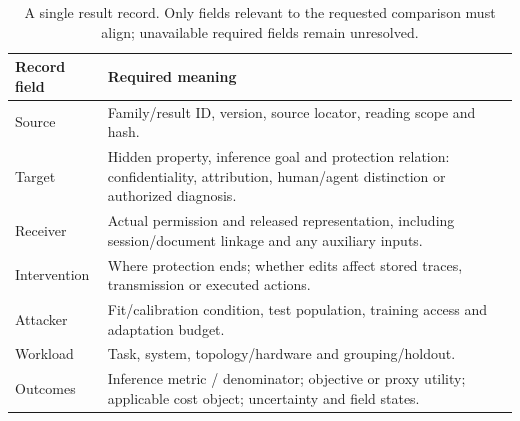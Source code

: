 \begin{table}[t]\centering\footnotesize
\caption{A single result record. Only fields relevant to the requested comparison must align; unavailable required fields remain unresolved.}\label{tab:result-record}
\begin{tabularx}{\columnwidth}{@{}p{}Y@{}}\toprule
Record field & Required meaning\\\midrule
Source & Family/result ID, version, source locator, reading scope and hash.\\
Target & Hidden property, inference goal and protection relation: confidentiality, attribution, human/agent distinction or authorized diagnosis.\\
Receiver & Actual permission and released representation, including session/document linkage and any auxiliary inputs.\\
Intervention & Where protection ends; whether edits affect stored traces, transmission or executed actions.\\
Attacker & Fit/calibration condition, test population, training access and adaptation budget.\\
Workload & Task, system, topology/hardware and grouping/holdout.\\
Outcomes & Inference metric / denominator; objective or proxy utility; applicable cost object; uncertainty and field states.\\\bottomrule
\end{tabularx}\end{table}
